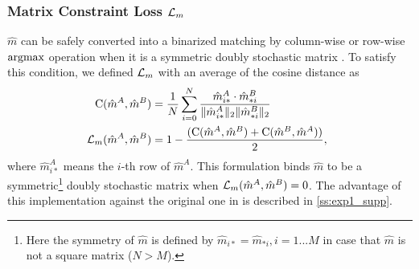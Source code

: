 \subsubsection{Matrix Constraint Loss \texorpdfstring{${\mathcal L}_m$}{Lm}}
$\hat{m}$ can be safely converted into a binarized matching by column-wise or row-wise ${\rm argmax}$ operation when it is a symmetric doubly stochastic matrix \cite{harvard2019}.
To satisfy this condition, we defined ${\mathcal L}_m$ with an average of the cosine distance as
\begin{equation}
\begin{split}
\hspace{-0.5em} {\rm C}(\hat{m}^A,\hat{m}^B)&=\frac{1}{N}\sum_{i=0}^N\frac{\hat{m}^A_{i*}\cdot\hat{m}^B_{*i}}{\|\hat{m}^A_{i*}\|_2\|\hat{m}^B_{*i}\|_2}\\
%
\hspace{-0.5em} \loss_m(\hat{m}^A,\hat{m}^B)&=1-\frac{({\rm C}(\hat{m}^A,\hat{m}^B)+{\rm C}(\hat{m}^B,\hat{m}^A))}{2},%
\end{split}
\label{eq:loss_c_p2}
\end{equation}
where $\hat{m}^A_{i*}$ means the $i$-th row of $\hat{m}^A$.
This formulation binds $\hat{m}$ to be a symmetric\footnote{Here the symmetry of $\hat{m}$ is defined by $\hat{m}_{i*} = \hat{m}_{*i}, i=1...M$ in case that $\hat{m}$ is not a square matrix ($N>M$).} doubly stochastic matrix when ${\mathcal L}_m(\hat{m}^A,\hat{m}^B)=0$.
The advantage of this implementation against the original one in \cite{harvard2019} is described in \ref{ss:exp1_supp}.

